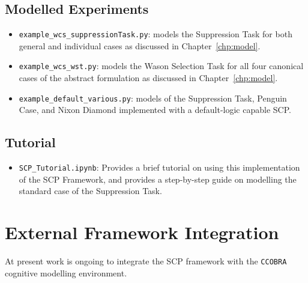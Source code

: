 \subsection{Modelled Experiments}
\begin{itemize}
\item \texttt{example\_wcs\_suppressionTask.py}: models the Suppression Task for both general and individual cases as discussed in Chapter~\ref{chp:model}.
\item \texttt{example\_wcs\_wst.py}: models the Wason Selection Task for all four canonical cases of the abstract formulation as discussed in Chapter~\ref{chp:model}.
\item \texttt{example\_default\_various.py}: models of the Suppression Task, Penguin Case, and Nixon Diamond implemented with a default-logic capable SCP.
\end{itemize}

\subsection{Tutorial}
\begin{itemize}
\item \texttt{SCP\_Tutorial.ipynb}: Provides a brief tutorial on using this implementation of the SCP Framework, and provides a step-by-step guide on modelling the standard case of the Suppression Task.
\end{itemize}

\section{External Framework Integration}
At present work is ongoing to integrate the SCP framework with the \texttt{CCOBRA} \citep{ccobra} cognitive modelling environment.













